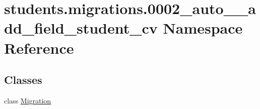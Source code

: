\hypertarget{namespacestudents_1_1migrations_1_10002__auto____add__field__student__cv}{\section{students.\-migrations.0002\-\_\-auto\-\_\-\-\_\-add\-\_\-field\-\_\-student\-\_\-cv Namespace Reference}
\label{namespacestudents_1_1migrations_1_10002__auto____add__field__student__cv}
}
\subsection*{Classes}
\begin{DoxyCompactItemize}
\item 
class \hyperlink{classstudents_1_1migrations_1_10002__auto____add__field__student__cv_1_1_migration}{Migration}
\end{DoxyCompactItemize}
